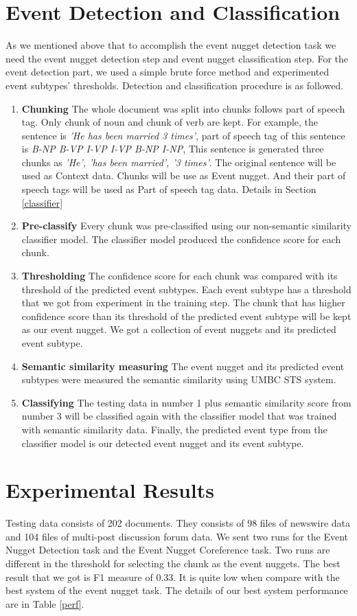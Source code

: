 \documentclass[11pt]{article}
\begin{document}
\section{Event Detection and Classification}
\label{detect}
As we mentioned above that to accomplish the event nugget detection task we need the event nugget detection step and event nugget classification step. For the event detection part, we used a simple brute force method and experimented event subtypes' thresholds. Detection and classification procedure is as followed.
\begin{enumerate}
\item \textbf{Chunking} The whole document was split into chunks follows part of speech tag. Only chunk of noun and chunk of verb are kept. For example, the sentence is {\em'He has been married 3 times'}, part of speech tag of this sentence is {\em B-NP B-VP I-VP I-VP B-NP I-NP}, This sentence is generated three chunks as {\em 'He', 'has been married', '3 times'}. The original sentence will be used as Context data. Chunks will be use as Event nugget. And their part of speech tags will be used as Part of speech tag data. Details in Section \ref{classifier}
\item \textbf{Pre-classify} Every chunk was pre-classified using our non-semantic similarity classifier model. The classifier model produced the confidence score for each chunk.
\item \textbf{Thresholding} The confidence score for each chunk was compared with its threshold of the predicted event subtypes. Each event subtype has a threshold that we got from experiment in the training step. The chunk that has higher confidence score than its threshold of the predicted event subtype will be kept as our event nugget. We got a collection of event nuggets and its predicted event subtype. 
\item \textbf{Semantic similarity measuring} The event nugget and its predicted event subtypes were measured the semantic similarity using UMBC STS system. 
\item \textbf{Classifying} The testing data in number 1 plus semantic similarity score from number 3 will be classified again with the classifier model that was trained with semantic similarity data. Finally, the predicted event type from the classifier model is our detected event nugget and its event subtype.
\end{enumerate}

\section{Experimental Results}
\label{results}
Testing data consists of 202 documents. They consists of 98 files of newswire data and 104 files of multi-post discussion forum data. We sent two runs for the Event Nugget Detection task and the Event Nugget Coreference task. Two runs are different in the threshold for selecting the chunk as the event nuggets. The best result that we got is F1 measure of 0.33. It is quite low when compare with the best system of the event nugget task. The details of our best system performance are in Table \ref{perf}.
\end{document}
